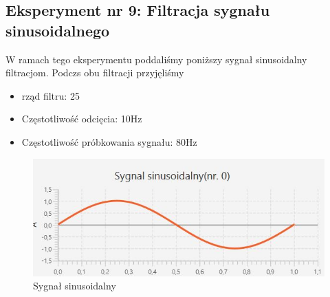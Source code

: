 \documentclass[12pt]{article}
\begin{document}
\subsection{Eksperyment nr 9: Filtracja sygnału sinusoidalnego} 
W ramach tego eksperymentu poddaliśmy poniższy sygnał sinusoidalny filtracjom. Podczs obu filtracji przyjęliśmy
\begin{itemize}
	\item rząd filtru: 25
	\item Częstotliwość odcięcia: 10Hz
	\item Częstotliwość próbkowania sygnału: 80Hz
\end{itemize}

\begin{figure}[H]
	\centering
	\includegraphics[width=\linewidth]{sinus-wejscie}
	\caption{Sygnał sinusoidalny}
	\label{}
\end{figure}
\end{document}
